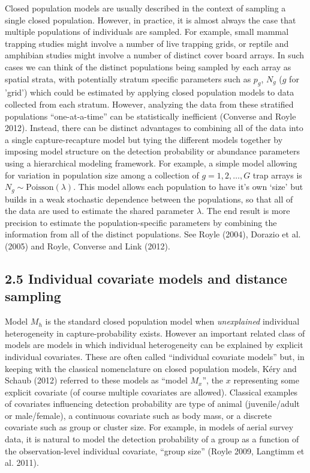 \documentclass{book}
\begin{document}
Closed population models are usually described in the context of
sampling a single closed population. However, in practice, it is
almost always the case that multiple populations of individuals are
sampled. For example, small mammal trapping studies might involve a
number of live trapping grids, or reptile and amphibian studies might
involve a number of distinct cover board arrays.  In such cases we can
think of the distinct populations being sampled by each array as spatial strata,
with potentially stratum specific parameters such as $p_{g}$, $N_{g}$
($g$ for 'grid') which could be estimated by applying closed
population models to data collected from each stratum.  However,
analyzing the data from these stratified populations ``one-at-a-time''
can be statistically inefficient (Converse and Royle 2012). Instead,
there can be distinct advantages to combining all of the data into a
single capture-recapture model but tying the different models together
by imposing model structure on the detection probability or abundance
parameters using a hierarchical modeling framework.  For example, a
simple model allowing for variation in population size among a
collection of $g=1,2,\ldots,G$ trap arrays is $N_{g} \sim
\mbox{Poisson}(\lambda)$. This model allows each population to have
it's own `size' but builds in a weak stochastic dependence between the
populations, so that all of the data are used to estimate the shared
parameter $\lambda$. The end result is more precision to estimate the
population-specific parameters by combining the information from all
of the distinct populations. See Royle (2004), Dorazio et al. (2005)
and Royle, Converse and Link (2012).


\subsection*{2.5 Individual covariate models and distance sampling}

Model $M_h$ is the standard closed population model when {\it
  unexplained} individual heterogeneity in capture-probability
exists. However an important related class of models are models in
which individual heterogeneity can be explained by explicit individual
covariates. These are often called ``individual covariate models''
but, in keeping with the classical nomenclature on closed population
models, K\'{e}ry and Schaub (2012) referred to these models as ``model
$M_{x}$'', the $x$ representing some explicit covariate (of course
multiple covariates are allowed).  Classical examples of covariates
influencing detection probability are type of animal (juvenile/adult
or male/female), a continuous covariate such as body mass, or a
discrete covariate such as group or cluster size. For example, in
models of aerial survey data, it is natural to model the detection
probability of a group as a function of the observation-level
individual covariate, ``group size'' (Royle 2009, Langtimm et
al. 2011).
\end{document}
